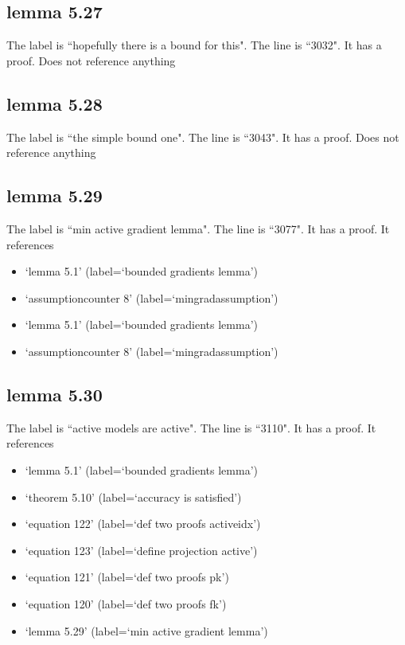 \documentclass{article}
\begin{document}
\subsection{lemma 5.27}
The label is ``hopefully there is a bound for this".
The line is ``3032".
It has a proof.
Does not reference anything
\subsection{lemma 5.28}
The label is ``the simple bound one".
The line is ``3043".
It has a proof.
Does not reference anything
\subsection{lemma 5.29}
The label is ``min active gradient lemma".
The line is ``3077".
It has a proof.
It references \begin{itemize}
\item `lemma 5.1' (label=`bounded gradients lemma')
\item `assumptioncounter 8' (label=`mingradassumption')
\item `lemma 5.1' (label=`bounded gradients lemma')
\item `assumptioncounter 8' (label=`mingradassumption')
\end{itemize}
\subsection{lemma 5.30}
The label is ``active models are active".
The line is ``3110".
It has a proof.
It references \begin{itemize}
\item `lemma 5.1' (label=`bounded gradients lemma')
\item `theorem 5.10' (label=`accuracy is satisfied')
\item `equation 122' (label=`def two proofs activeidx')
\item `equation 123' (label=`define projection active')
\item `equation 121' (label=`def two proofs pk')
\item `equation 120' (label=`def two proofs fk')
\item `lemma 5.29' (label=`min active gradient lemma')
\end{itemize}
\end{document}
